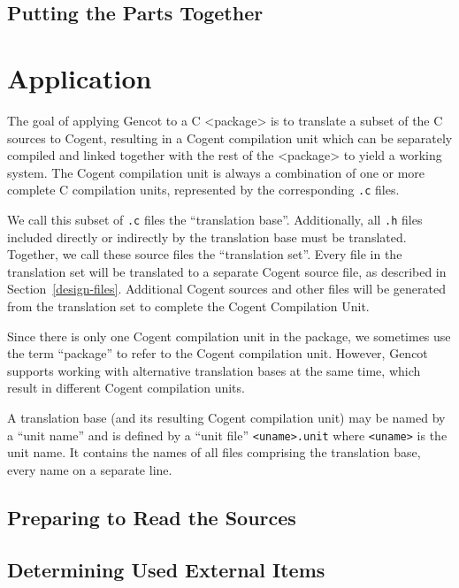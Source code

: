 \documentclass[a4paper]{report}
\newcommand{\code}[1]{\textnormal{\texttt{#1}}}
\begin{document}
\section{Putting the Parts Together}
\label{impl-all}


\chapter{Application}

The goal of applying Gencot to a C <package> is to translate a subset of the C sources to Cogent,
resulting in a Cogent compilation unit which can be separately compiled and linked together with
the rest of the <package> to yield a working system. The Cogent compilation unit is always a
combination of one or more complete C compilation units, represented by the corresponding \code{.c} 
files.

We call this subset of \code{.c} files the ``translation base''. Additionally, all \code{.h} files
included directly or indirectly by the translation base must be translated. Together, we call these
source files the ``translation set''. Every file in the translation set will be translated to a 
separate Cogent source file, as described in Section~\ref{design-files}. Additional Cogent sources
and other files will be generated from the translation set to complete the Cogent Compilation Unit.

Since there is only one Cogent compilation unit in the package, we sometimes use the term ``package''
to refer to the Cogent compilation unit. However, Gencot supports working with alternative 
translation bases at the same time, which result in different Cogent compilation units.

A translation base (and its resulting Cogent compilation unit) may be named by a ``unit name'' and
is defined by a ``unit file'' \code{<uname>.unit} where \code{<uname>} is the unit name. It contains 
the names of all files comprising the translation base, every name on a separate line. 

\section{Preparing to Read the Sources}
\label{app-prep}
%

\section{Determining Used External Items}
\label{app-items}

\end{document}
